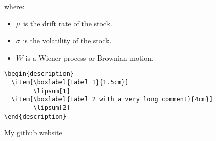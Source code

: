 \documentclass[../main.tex]{subfiles}
\begin{document}
where:
\begin{itemize}
    \item \( \mu \) is the drift rate of the stock.
    \item \( \sigma \) is the volatility of the stock.
    \item \( W \) is a Wiener process or Brownian motion.
\end{itemize}


\begin{verbatim}
\begin{description}
  \item[\boxlabel{Label 1}{1.5cm}]
        \lipsum[1]
  \item[\boxlabel{Label 2 with a very long comment}{4cm}]
        \lipsum[2]
\end{description}
\end{verbatim}
\href{https://github.com/eraser83k}{My github website}


\end{document}
